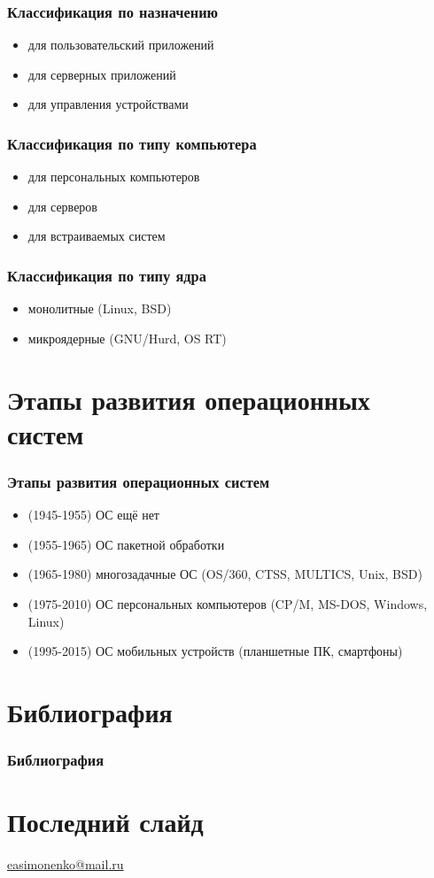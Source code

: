 \documentclass[9pt,pdf]{beamer}
\begin{document}
\begin{frame}
	\frametitle{Классификация по назначению}
	\begin{itemize}
		\item для пользовательский приложений
		\item для серверных приложений
		\item для управления устройствами
	\end{itemize}
\end{frame}

\begin{frame}
	\frametitle{Классификация по типу компьютера}
	\begin{itemize}
		\item для персональных компьютеров
		\item для серверов
		\item для встраиваемых систем
	\end{itemize}
\end{frame}

\begin{frame}
	\frametitle{Классификация по типу ядра}
	\begin{itemize}
		\item монолитные (Linux, BSD)
		\item микроядерные (GNU/Hurd, OS RT)
	\end{itemize}
\end{frame}

\section{Этапы развития операционных систем}

\begin{frame}
	\frametitle{Этапы развития операционных систем}
	\begin{itemize}
		\item (1945-1955) ОС ещё нет
		\item (1955-1965) ОС пакетной обработки
		\item (1965-1980) многозадачные ОС (OS/360, CTSS, MULTICS, Unix, BSD)
		\item (1975-2010) ОС персональных компьютеров (CP/M, MS-DOS, Windows, Linux)
		\item (1995-2015) ОС мобильных устройств (планшетные ПК, смартфоны)
	\end{itemize}
\end{frame}

\section{Библиография}

\begin{frame}
	\frametitle{Библиография}
	\printbibliography
\end{frame}

\section*{Последний слайд}

\begin{frame}
	\center
	
	\textbf{\textsl{\inserttitle}}
	
	\textsl{\insertsubtitle}
	
	\insertauthor
	
	\url{easimonenko@mail.ru}
\end{frame}
\end{document}
